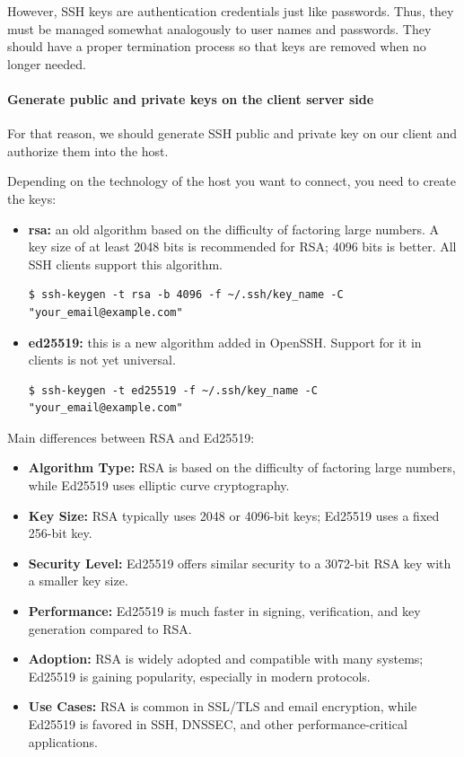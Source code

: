 \documentclass{article}
\newenvironment{blocktemplateI}[1]{%
    \tcolorbox[beamer,%
    noparskip,breakable,
    colframe=Violet,%
    colbacklower=Black,%
    title=#1]}%
    {\endtcolorbox}
\newenvironment{codetemplate}[1][]{%
  \mybasecolorbox[#1]
  \itshape
}{%
  \endmybasecolorbox
}
\begin{document}
However, SSH keys are authentication credentials just like passwords. Thus, they must be managed somewhat analogously to user names and passwords. They should have a proper termination process so that keys are removed when no longer needed.

\paragraph{Generate public and private keys on the client server side}

For that reason, we should generate SSH public and private key on our client and authorize them into the host.

Depending on the technology of the host you want to connect, you need to create the keys:

\begin{itemize}
    \item \textbf{rsa:} an old algorithm based on the difficulty of factoring large numbers. A key size of at least 2048 bits is recommended for RSA; 4096 bits is better. All SSH clients support this algorithm.
\begin{codetemplate}{}
\begin{verbatim}
$ ssh-keygen -t rsa -b 4096 -f ~/.ssh/key_name -C "your_email@example.com" 
\end{verbatim}
\end{codetemplate}
    \item \textbf{ed25519:} this is a new algorithm added in OpenSSH. Support for it in clients is not yet universal.
\begin{codetemplate}{}
\begin{verbatim}
$ ssh-keygen -t ed25519 -f ~/.ssh/key_name -C "your_email@example.com"
\end{verbatim}
\end{codetemplate}
\end{itemize}

\begin{blocktemplateI}{Note}
Main differences between RSA and Ed25519:
\begin{itemize}
    \item \textbf{Algorithm Type:} RSA is based on the difficulty of factoring large numbers, while Ed25519 uses elliptic curve cryptography.
    \item \textbf{Key Size:} RSA typically uses 2048 or 4096-bit keys; Ed25519 uses a fixed 256-bit key.
    \item \textbf{Security Level:} Ed25519 offers similar security to a 3072-bit RSA key with a smaller key size.
    \item \textbf{Performance:} Ed25519 is much faster in signing, verification, and key generation compared to RSA.
    \item \textbf{Adoption:} RSA is widely adopted and compatible with many systems; Ed25519 is gaining popularity, especially in modern protocols.
    \item \textbf{Use Cases:} RSA is common in SSL/TLS and email encryption, while Ed25519 is favored in SSH, DNSSEC, and other performance-critical applications.
\end{itemize}
\end{blocktemplateI}
\end{document}
